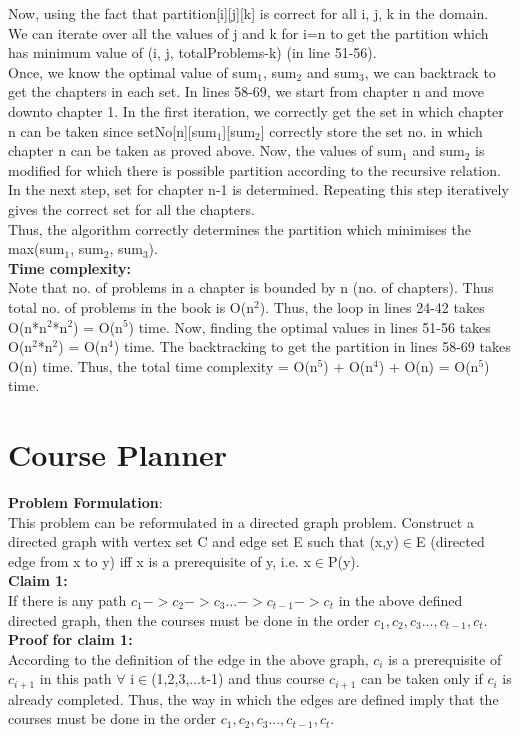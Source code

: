 \documentclass{article}
\begin{document}
Now, using the fact that partition[i][j][k] is correct for all i, j, k in the domain. We can iterate over all the values of j and k for i=n to get the partition which has minimum value of (i, j, totalProblems-k) (in line 51-56).\\
Once, we know the optimal value of sum$_{1}$, sum$_{2}$ and sum$_{3}$, we can backtrack to get the chapters in each set. In lines 58-69, we start from chapter n and move downto chapter 1. In the first iteration, we correctly get the set in which chapter n can be taken since setNo[n][sum$_{1}$][sum$_{2}$] correctly store the set no. in which chapter n can be taken as proved above. Now, the values of sum$_{1}$ and sum$_{2}$ is modified for which there is possible partition according to the recursive relation. In the next step, set for chapter n-1 is determined. Repeating this step iteratively gives the correct set for all the chapters.\\
Thus, the algorithm correctly determines the partition which minimises the max(sum$_{1}$, sum$_{2}$, sum$_{3}$). \\

\textbf{Time complexity:}\\
Note that no. of problems in a chapter is bounded by n (no. of chapters). Thus total no. of problems in the book is O(n$^2$). Thus, the loop in lines 24-42 takes O(n*n$^2$*n$^2$) = O(n$^5$) time. Now, finding the optimal values in lines 51-56 takes O(n$^2$*n$^2$) = O(n$^4$) time. The backtracking to get the partition in lines 58-69 takes O(n) time. Thus, the total time complexity = O(n$^5$) + O(n$^4$) + O(n) = O(n$^5$) time.
\newpage
\section{Course Planner}
\textbf{Problem Formulation}:\\
This problem can be reformulated in a directed graph problem. Construct a directed graph with vertex set C and edge set E such that (x,y)$\in$E (directed edge from x to y) iff x is a prerequisite of y, i.e. x$\in$P(y).\\
\textbf{Claim 1:}\\
If there is any path $c_1->c_2->c_3...->c_{t-1}->c_t$ in the above defined directed graph, then the courses must be done in the order $c_1, c_2, c_3..., c_{t-1}, c_t$.
\\
\textbf{Proof for claim 1:}\\
According to the definition of the edge in the above graph, $c_i$ is a prerequisite of $c_{i+1}$ in this path $\forall$ i$\in$(1,2,3,...t-1) and thus course $c_{i+1}$ can be taken only if $c_i$ is already completed. Thus, the way in which the edges are defined imply that the courses must be done in the order $c_1, c_2, c_3..., c_{t-1}, c_t$.
\end{document}
